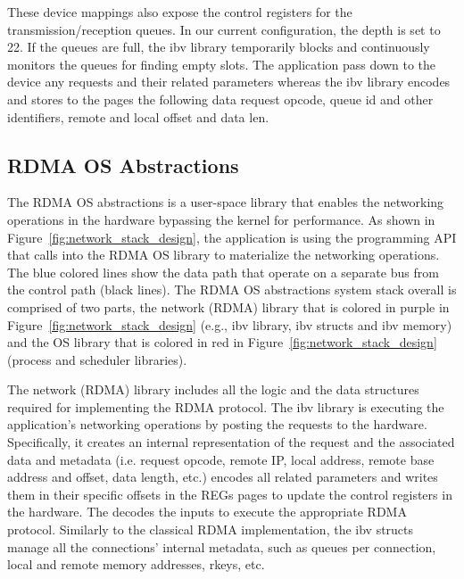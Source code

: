 These device mappings also expose the control registers for the  transmission/reception queues. In our current \projecttitle{} configuration, the depth is set to 22. If the queues are full, the ibv library temporarily blocks and continuously monitors the queues for finding empty slots.  The application pass down to the device any requests and their related parameters whereas the ibv library encodes and stores to the pages the following data request opcode, queue id and other identifiers, remote and local offset and data len. %

\subsection{RDMA OS Abstractions} The RDMA OS abstractions is a user-space library that enables the networking operations in the \projecttitle{} hardware bypassing the kernel for performance. As shown in Figure~\ref{fig:network_stack_design}, the application is using the \projecttitle{} programming API that calls into the RDMA OS library to materialize the networking operations. The blue colored lines show the data path that operate on a separate bus from the control path (black lines). The RDMA OS abstractions system stack overall is comprised of two parts, the network (RDMA) library that is colored in purple in Figure~\ref{fig:network_stack_design} (e.g., ibv library, ibv structs and ibv memory) and the OS library that is colored in red in Figure~\ref{fig:network_stack_design} (process and scheduler libraries).

 The network (RDMA) library includes all the logic and the data structures required for implementing the RDMA protocol. The ibv library is executing the application's networking operations by posting the requests to the hardware. Specifically, it creates an internal representation of the request and the associated data and metadata (i.e. request opcode, remote IP, local address, remote base address and offset, data length, etc.) encodes all related parameters and writes them in their specific offsets in the REGs pages to update the control registers in the \projecttitle{} hardware. The \projecttitle{} decodes the inputs to execute the appropriate RDMA protocol. Similarly to the classical RDMA implementation, the ibv structs manage all the connections' internal metadata, such as queues per connection, local and remote memory addresses, rkeys, etc. 

